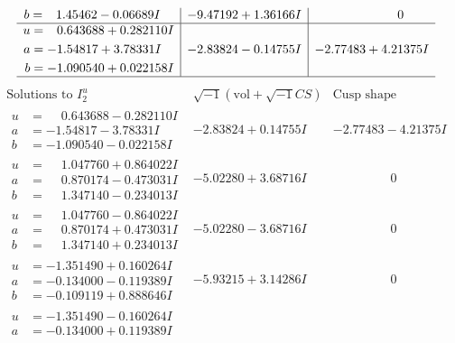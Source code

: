 \documentclass[1p]{elsarticle_modified}
\theoremstyle{definition}
\newcommand{\I}{\sqrt{-1}}
\begin{document}
$$\begin{array}{c|c|c}
\begin{aligned}
b &= \phantom{-}1.45462 - 0.06689 I\end{aligned}
 & -9.47192 + 1.36166 I & \phantom{-0.000000 } 0 \\ \hline\begin{aligned}
u &= \phantom{-}0.643688 + 0.282110 I \\
a &= -1.54817 + 3.78331 I \\
b &= -1.090540 + 0.022158 I\end{aligned}
 & -2.83824 - 0.14755 I & -2.77483 + 4.21375 I\\
 \hline 
 \end{array}$$\newpage$$\begin{array}{c|c|c}  
\text{Solutions to }I^u_{2}& \I (\text{vol} + \sqrt{-1}CS) & \text{Cusp shape}\\
 \hline 
\begin{aligned}
u &= \phantom{-}0.643688 - 0.282110 I \\
a &= -1.54817 - 3.78331 I \\
b &= -1.090540 - 0.022158 I\end{aligned}
 & -2.83824 + 0.14755 I & -2.77483 - 4.21375 I \\ \hline\begin{aligned}
u &= \phantom{-}1.047760 + 0.864022 I \\
a &= \phantom{-}0.870174 - 0.473031 I \\
b &= \phantom{-}1.347140 - 0.234013 I\end{aligned}
 & -5.02280 + 3.68716 I & \phantom{-0.000000 } 0 \\ \hline\begin{aligned}
u &= \phantom{-}1.047760 - 0.864022 I \\
a &= \phantom{-}0.870174 + 0.473031 I \\
b &= \phantom{-}1.347140 + 0.234013 I\end{aligned}
 & -5.02280 - 3.68716 I & \phantom{-0.000000 } 0 \\ \hline\begin{aligned}
u &= -1.351490 + 0.160264 I \\
a &= -0.134000 - 0.119389 I \\
b &= -0.109119 + 0.888646 I\end{aligned}
 & -5.93215 + 3.14286 I & \phantom{-0.000000 } 0 \\ \hline\begin{aligned}
u &= -1.351490 - 0.160264 I \\
a &= -0.134000 + 0.119389 I \\

\end{aligned}
\end{array}$$
\end{document}
